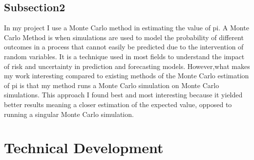\documentclass{llncs}
\begin{document}
\subsection{Subsection2} In my project I use a Monte Carlo method in estimating the value of pi. A Monte Carlo Method is when simulations are used to model the probability of different outcomes in a process that cannot easily be predicted due to the intervention of random variables. It is a technique used in most fields to understand the impact of risk and uncertainty in prediction and forecasting models. However,what makes my work interesting compared to existing methods of the Monte Carlo estimation of pi is that my method runs a Monte Carlo simulation on Monte Carlo simulations. This approach I found best and most interesting because it yielded better results meaning a closer estimation of the expected value, opposed to running a singular Monte Carlo simulation.

\section{Technical Development}
\end{document}
